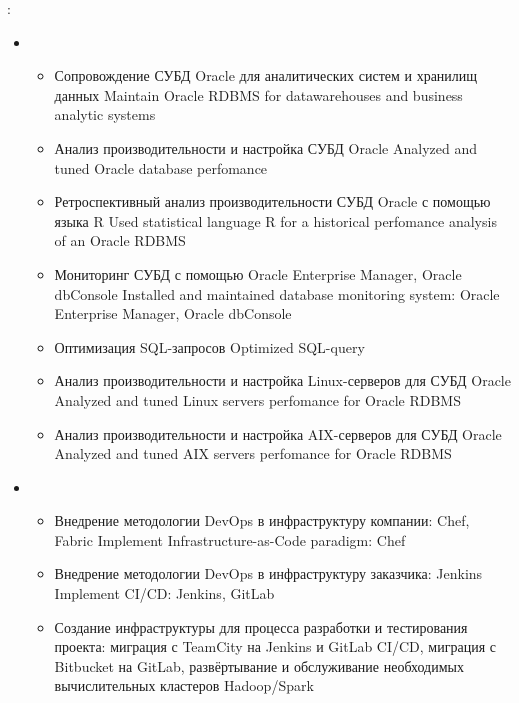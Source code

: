 \documentclass[11pt,a4paper,sans, russian]{moderncv}        %
\begin{document}
{\protect{}}
{}
{}
{
	\achievements:
	\begin{itemize}
		\item {}
		\begin{itemize}
			\item {}
				{Сопровождение СУБД Oracle для аналитических систем и хранилищ данных}
				{Maintain Oracle RDBMS for datawarehouses and business analytic systems}
			\item {}
				{Анализ производительности и настройка СУБД Oracle}
				{Analyzed and tuned Oracle database perfomance}
			\item {}
				{Ретроспективный анализ производительности СУБД Oracle с помощью языка R}
				{Used statistical language R for a historical perfomance analysis of an Oracle RDBMS}
			\item {}
				{Мониторинг СУБД с помощью Oracle Enterprise Manager, Oracle dbConsole}
				{Installed and maintained database monitoring system: Oracle Enterprise Manager, Oracle dbConsole}
			\item {}
				{Оптимизация SQL-запросов}
				{Optimized SQL-query}
			\item {}
				{Анализ производительности и настройка Linux-серверов для СУБД Oracle}
				{Analyzed and tuned Linux servers perfomance for Oracle RDBMS}
			\item {}
				{Анализ производительности и настройка AIX-серверов для СУБД Oracle}
				{Analyzed and tuned AIX servers perfomance for Oracle RDBMS}
		\end{itemize}
		\item {}
		\begin{itemize}
			\item {}
				{Внедрение методологии DevOps в инфраструктуру компании: Chef, Fabric}
				{Implement Infrastructure-as-Code paradigm: Chef}
			\item {}
				{Внедрение методологии DevOps в инфраструктуру заказчика: Jenkins}
				{Implement CI/CD: Jenkins, GitLab}
			\item {}
				{Создание инфраструктуры для процесса разработки и тестирования проекта: миграция с TeamCity на Jenkins и GitLab CI/CD, миграция с Bitbucket на GitLab, развёртывание и обслуживание необходимых вычислительных кластеров Hadoop/Spark}

\end{itemize}
\end{itemize}}
\end{document}
